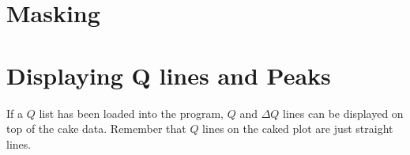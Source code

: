 \section{Masking}

\section{Displaying Q lines and Peaks}
If a $Q$ list has been loaded into the program, 
$Q$ and $\Delta Q$ lines can be displayed on top
of the cake data. Remember that $Q$ lines on the
caked plot are just straight lines. 



\begin{figure}
    \centering

\end{figure}
